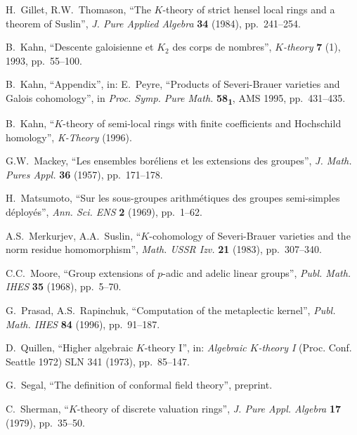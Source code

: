 \documentclass[11pt,a4paper]{article}
\theoremstyle{plain}
\theoremstyle{definition}
\begin{document}
\begin{enumerate}[label={[\arabic*]}, leftmargin=*]
\item H.~Gillet, R.W.~Thomason, ``The $K$-theory of strict hensel local rings and a theorem of Suslin'', \textit{J. Pure Applied Algebra} \textbf{34} (1984), pp.~241--254.

\item B.~Kahn, ``Descente galoisienne et $K_2$ des corps de nombres'', \textit{$K$-theory} \textbf{7} (1), 1993, pp.~55--100.

\item B.~Kahn, ``Appendix'', in: E.~Peyre, ``Products of Severi-Brauer varieties and Galois cohomology'', in \textit{Proc. Symp. Pure Math.} \textbf{58\textsubscript{1}}, AMS 1995, pp.~431--435.

\item B.~Kahn, ``$K$-theory of semi-local rings with finite coefficients and Hochschild homology'', \textit{K-Theory} (1996).

\item G.W.~Mackey, ``Les ensembles bor\'eliens et les extensions des groupes'', \textit{J. Math. Pures Appl.} \textbf{36} (1957), pp.~171--178.

\item H.~Matsumoto, ``Sur les sous-groupes arithm\'etiques des groupes semi-simples d\'eploy\'es'', \textit{Ann. Sci. ENS} \textbf{2} (1969), pp.~1--62.

\item A.S.~Merkurjev, A.A.~Suslin, ``$K$-cohomology of Severi-Brauer varieties and the norm residue homomorphism'', \textit{Math. USSR Izv.} \textbf{21} (1983), pp.~307--340.

\item C.C.~Moore, ``Group extensions of $p$-adic and adelic linear groups'', \textit{Publ. Math. IHES} \textbf{35} (1968), pp.~5--70.

\item G.~Prasad, A.S.~Rapinchuk, ``Computation of the metaplectic kernel'', \textit{Publ. Math. IHES} \textbf{84} (1996), pp.~91--187.

\item D.~Quillen, ``Higher algebraic $K$-theory I'', in: \textit{Algebraic $K$-theory I} (Proc. Conf. Seattle 1972) SLN 341 (1973), pp.~85--147.

\item G.~Segal, ``The definition of conformal field theory'', preprint.

\item C.~Sherman, ``$K$-theory of discrete valuation rings'', \textit{J. Pure Appl. Algebra} \textbf{17} (1979), pp.~35--50.


\end{enumerate}
\end{document}
